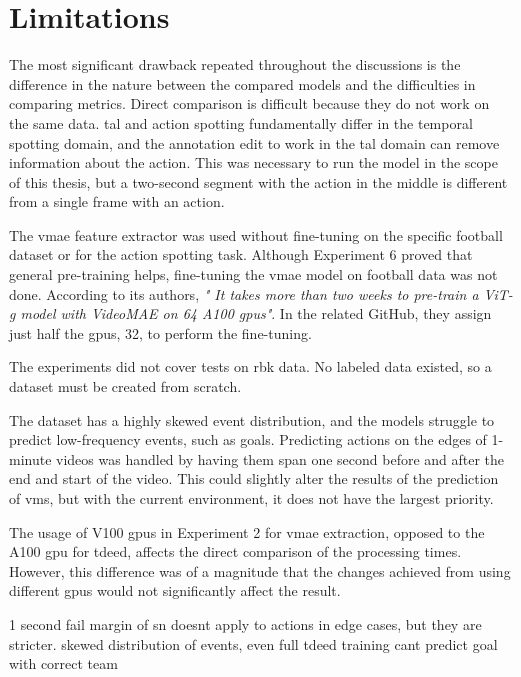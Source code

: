 \section{Limitations}

The most significant drawback repeated throughout the discussions is the difference in the nature between the compared models and the difficulties in comparing metrics. Direct comparison is difficult because they do not work on the same data. \acrfull{tal} and action spotting fundamentally differ in the temporal spotting domain, and the annotation edit to work in the \acrshort{tal} domain can remove information about the action. This was necessary to run the model in the scope of this thesis, but a two-second segment with the action in the middle is different from a single frame with an action. 

The \acrshort{vmae} feature extractor was used without fine-tuning on the specific football dataset or for the action spotting task. Although Experiment 6 proved that general pre-training helps, fine-tuning the \acrshort{vmae} model on football data was not done. According to its authors, \textit{" It takes more than two weeks to pre-train a ViT-g model with VideoMAE on 64 A100 \acrshort{gpu}s"}\cite{wang_videomae_2023}. In the related GitHub, they assign just half the \acrshort{gpu}s, 32, to perform the fine-tuning. 

The experiments did not cover tests on \acrfull{rbk} data. No labeled data existed, so a dataset must be created from scratch. 

The dataset has a highly skewed event distribution, and the models struggle to predict low-frequency events, such as goals. Predicting actions on the edges of 1-minute videos was handled by having them span one second before and after the end and start of the video. This could slightly alter the results of the prediction of \acrshort{vms}, but with the current environment, it does not have the largest priority. 

The usage of V100 \acrshort{gpu}s in Experiment 2 for \acrshort{vmae} extraction, opposed to the A100 \acrshort{gpu} for \acrshort{tdeed}, affects the direct comparison of the processing times. However, this difference was of a magnitude that the changes achieved from using different \acrshort{gpu}s would not significantly affect the result. 



1 second fail margin of sn doesnt apply to actions in edge cases, but they are stricter. 
skewed distribution of events, even full tdeed training cant predict goal with correct team


